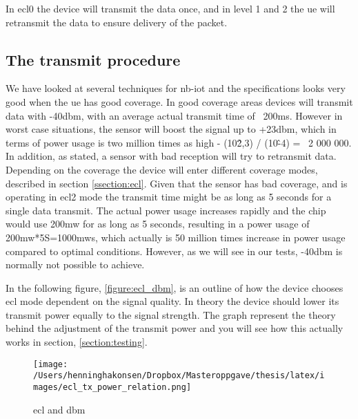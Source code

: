 \documentclass[USenglish]{ifimaster}  %
\begin{document}
In \acrshort{ecl}0 the device will transmit the data once, and in level 1 and 2 the \acrshort{ue} will retransmit the data to ensure delivery of the packet.

\subsection{The transmit procedure}
We have looked at several techniques for \acrshort{nb-iot} and the specifications looks very good when the \acrshort{ue} has good coverage. In good coverage areas devices will transmit data with -40\acrshort{dbm}, with an average actual transmit time of ~200ms. However in worst case situations, the sensor will boost the signal up to +23\acrshort{dbm}, which in terms of power usage is two million times as high - (10\^2,3) / (10\^-4) = ~2 000 000. In addition, as stated, a sensor with bad reception will try to retransmit data. Depending on the coverage the device will enter different coverage modes, described in section \vref{ssection:ecl}. Given that the sensor has bad coverage, and is operating in \acrshort{ecl}2 mode the transmit time might be as long as 5 seconds for a single data transmit. The actual power usage increases rapidly and the chip would use 200\acrshort{mw} for as long as 5 seconds, resulting in a power usage of 200\acrshort{mw}*5S=1000\acrshort{mws}, which actually is 50 million times increase in power usage compared to optimal conditions. However, as we will see in our tests, -40\acrshort{dbm} is normally not possible to achieve.

In the following figure, \vref{figure:ecl_dbm}, is an outline of how the device chooses \acrshort{ecl} mode dependent on the signal quality. In theory the device should lower its transmit power equally to the signal strength. The graph represent the theory behind the adjustment of the transmit power and you will see how this actually works in section, \vref{section:testing}.


\begin{figure}[ht]
  \centering\texttt{[image: /Users/henninghakonsen/Dropbox/Masteroppgave/thesis/latex/images/ecl\_tx\_power\_relation.png]}
  \caption{\acrshort{ecl} and \acrshort{dbm}}
  \label{figure:ecl_dbm}
\end{figure}
\end{document}
